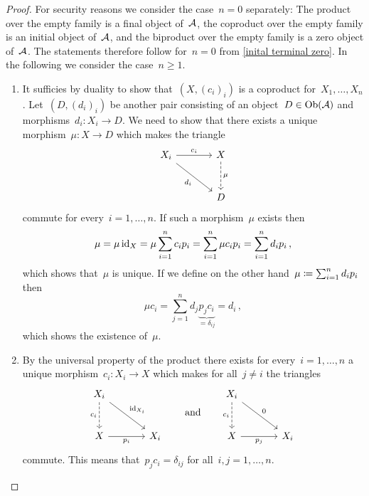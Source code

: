 \begin{proof}
  For security reasons we consider the case~$n = 0$ separately:
  The product over the empty family is a final object of~$\mathcal{A}$, the coproduct over the empty family is an initial object of~$\mathcal{A}$, and the biproduct over the empty family is a zero object of~$\mathcal{A}$.
  The statements therefore follow for~$n = 0$ from \cref{inital terminal zero}.
  In the following we consider the case~$n \geq 1$.
  \begin{enumerate}
    \item
      It sufficies by duality to show that~$(X, (c_i)_i)$ is a coproduct for~$X_1, \dotsc, X_n$.
      Let~$(D, (d_i)_i)$ be another pair consisting of an object~$D \in \operatorname{Ob}(\mathcal{A})$ and morphisms~$d_i \colon X_i \to D$.
      We need to show that there exists a unique morphism~$\mu \colon X \to D$ which makes the triangle
      \[
        \begin{tikzcd}[sep = large]
            X_i
            \arrow{r}[above]{c_i}
            \arrow{dr}[below left]{d_i}
          & X
            \arrow[dashed]{d}[right]{\mu}
          \\
            {}
          & D
        \end{tikzcd}
      \]
      commute for every~$i = 1, \dotsc, n$. 
      If such a morphism~$\mu$ exists then
      \[
          \mu
        = \mu \operatorname{id}_X
        = \mu \sum_{i=1}^n c_i p_i
        = \sum_{i=1}^n \mu c_i p_i
        = \sum_{i=1}^n d_i p_i \,,
      \]
      which shows that~$\mu$ is unique.
      If we define on the other hand~$\mu \coloneqq \sum_{i=1}^n d_i p_i$ then
      \[
          \mu c_i
        = \sum_{j=1}^n d_j \underbrace{p_j c_i}_{= \delta_{ij}}
        = d_i \,,
      \]
      which shows the existence of~$\mu$.
    \item
      By the universal property of the product there exists for every~$i = 1, \dotsc, n$ a unique morphism~$c_i \colon X_i \to X$ which makes for all~$j \neq i$ the triangles
      \[
        \begin{tikzcd}[sep = large]
            X_i
            \arrow{dr}[above right]{\id_{X_i}}
            \arrow[dashed]{d}[left]{c_i}
          & {}
          \\
            X
            \arrow{r}[below]{p_i}
          & X_i
        \end{tikzcd}
        \qquad\text{and}\qquad
        \begin{tikzcd}[sep = large]
            X_i
            \arrow{dr}[above right]{0}
            \arrow[dashed]{d}[left]{c_i}
          & {}
          \\
            X
            \arrow{r}[below]{p_j}
          & X_i
        \end{tikzcd}
      \]
      commute.
      This means that~$p_j c_i = \delta_{ij}$ for all~$i, j = 1, \dotsc, n$.
      

\end{enumerate}
\end{proof}
